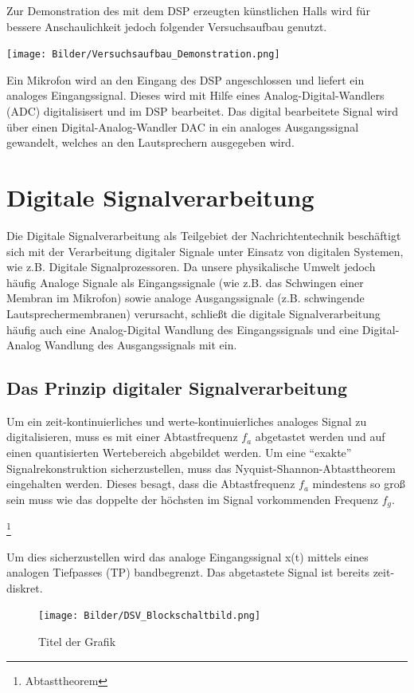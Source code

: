\documentclass[a4paper,12pt,fontsize=12,DIV=12]{scrartcl}
\begin{document}
Zur Demonstration des mit dem DSP erzeugten künstlichen Halls wird für bessere Anschaulichkeit jedoch folgender Versuchsaufbau genutzt.
\begin{center}
	\texttt{[image: Bilder/Versuchsaufbau\_Demonstration.png]}
\end{center}
%
%
Ein Mikrofon wird an den Eingang des DSP angeschlossen und liefert ein analoges Eingangssignal. Dieses wird mit Hilfe eines Analog-Digital-Wandlers (ADC) digitalisisert und im DSP bearbeitet. Das digital bearbeitete Signal wird über einen Digital-Analog-Wandler DAC in ein analoges Ausgangssignal gewandelt, welches an den Lautsprechern ausgegeben wird.


\section{Digitale Signalverarbeitung}
Die Digitale Signalverarbeitung als Teilgebiet der Nachrichtentechnik beschäftigt sich mit der Verarbeitung digitaler Signale unter Einsatz von digitalen Systemen, wie z.B. Digitale Signalprozessoren.
Da unsere physikalische Umwelt jedoch häufig Analoge Signale als Eingangssignale (wie z.B. das Schwingen einer Membran im Mikrofon) sowie analoge Ausgangssignale (z.B. schwingende Lautsprechermembranen) verursacht, schließt die digitale Signalverarbeitung häufig auch eine Analog-Digital Wandlung des Eingangssignals und eine Digital-Analog Wandlung des Ausgangssignals mit ein.

\subsection{Das Prinzip digitaler Signalverarbeitung}
Um ein zeit-kontinuierliches und werte-kontinuierliches analoges Signal zu digitalisieren, muss es mit einer Abtastfrequenz $f_a$ abgetastet werden und auf einen quantisierten Wertebereich abgebildet werden. 
Um eine "`exakte"' Signalrekonstruktion sicherzustellen, muss das Nyquist-Shannon-Abtasttheorem eingehalten werden. Dieses besagt, dass die Abtastfrequenz $f_a$ mindestens so groß sein muss wie das doppelte der höchsten im Signal vorkommenden Frequenz $f_g$.
\begin{center}
 \footnote{Abtasttheorem }\\
\end{center}
Um dies sicherzustellen wird das analoge Eingangssignal x(t) mittels eines analogen Tiefpasses (TP) bandbegrenzt. Das abgetastete Signal ist bereits zeit-diskret.
%
\begin{figure}[h]
	\texttt{[image: Bilder/DSV\_Blockschaltbild.png]}
	\caption{Titel der Grafik}
	\label{labelname}
\end{figure}
%
\end{document}

